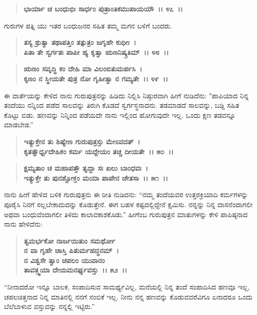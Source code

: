 \begin{verse}
\textbf{ಭಾರ್ಯಾ ಚ ಬಂಧುಭಿಃ ಸಾರ್ಧಂ ಪುತ್ರಾಂತಿಕಮುಪಾಯಯೌ~।। ೪೭~।।}
\end{verse}

ಗುರುಗಳ ಪತ್ನಿ ಯು ಇತರ ಬಂಧುಜನರ ಸಹಿತ ತಮ್ಮ ಮಗನ ಬಳಿಗೆ ಬಂದರು.

\begin{verse}
\textbf{ತಸ್ಯ ಶ್ರುತ್ವಾ ತಥಾಪತ್ತಿಂ ತತ್ಪುತ್ರಂ ಜಗೃಹೇ ಕುಧೀಃ~।}\\\textbf{ಪಿತಾ ತೇ ಸ್ವರ್ಗತಃ ಪಾಪೀ ಹ್ಯ ಕೃತ್ವಾ ಋಣನಿಷ್ಕ್ರತಿಮ್~।। ೪೮~।। }
\end{verse}

\begin{verse}
\textbf{ಋಣಂ ಸವೃದ್ಧಿ ಕಂ ದೇಹಿ ಮಾ ವಿಲಂಬಿತುಮರ್ಹಸಿ~।}\\\textbf{ಕೃಣಂ ನ ಸ್ಥೀಯತೇ ಪುತ್ರ ನೋ ಗೃಹೀತ್ವಾ ನ ಗಮ್ಯತೇ~।। ೪೯~।।}
\end{verse}

ಈ ವಾರ್ತೆಯನ್ನು ಕೇಳಿದ ನಾನು ಗುರುಪುತ್ರನನ್ನು ಹಿಡಿದು ನಿಲ್ಲಿಸಿ ನಿಷ್ಠುರವಾಗಿ ಹೀಗೆ ನುಡಿದೆನು: "ಪಾಪಿಯಾದ ನಿನ್ನ ತಂದೆಯು ನನ್ನಿಂದ ಪಡೆದ ಸಾಲವನ್ನು ತಿರುಗಿ ಕೊಡದೆ ಸ್ವರ್ಗಸ್ಥನಾದನು. ತಡಮಾಡದೆ ಸಾಲವನ್ನು, ಬಡ್ಡಿ ಸಹಿತ ಕೊಟ್ಟು ಬಿಡು. ಹಣವನ್ನು ನಿನ್ನಿಂದ ಪಡೆಯದೇ ನಾನು ಇಲ್ಲಿಂದ ಹೋಗುವುದೇ ಇಲ್ಲ. ಒಂದು ಕ್ಷಣ ತಡವನ್ನೂ ಮಾಡಬೇಡ.”

\begin{verse}
\textbf{ಇತ್ಯುಕ್ತೇನ ತು ಶಿಷ್ಯೇಣ ಗುರುಪುತ್ರಸ್ತು ಮೇಽವದತ್~।}\\\textbf{ ಕೃತತ್ವೌರ್ಧ್ವದೇಹಿಕಂ ಕರ್ಮ ಯದ್ದೇಯಂ ತಚ್ಚ ದೀಯತೇ~।। ೫೦~।। }
\end{verse}

\begin{verse}
\textbf{ಕ್ಷಮ್ಯತಾಂ ಚ ಮಹಾಪತ್ತೌ ತ್ವದ್ದಾ ಸಃ ಖಲು ಬಾಂಧವಃ~।}\\\textbf{ಇತ್ಯುಕ್ತೇ ತು ಪುನಶ್ಚೋಕ್ತಂ ಮಯಾ ಪಾಪೇನ ಚೇತಸಾ~।। ೫೧~।।}
\end{verse}

ನಾನು ಹೀಗೆ ಹೇಳಿದ ಬಳಿಕ ಗುರುಪುತ್ರನು ಈ ರೀತಿ ನುಡಿದನು: “ನಮ್ಮ ತಂದೆಯವರ ಉತ್ತರಕ್ರಿಯಾದಿ ಕರ್ಮಗಳನ್ನು ಪೂರೈಸಿ ನಿನಗೆ ಸಲ್ಲಬೇಕಾದುದನ್ನು ಕೊಡುತ್ತೇನೆ. ಈಗ ಬಹಳ ಕಷ್ಟದಲ್ಲಿದ್ದೇನೆ ಕ್ಷಮಿಸು. ನನ್ನನ್ನು ನಿನ್ನ ದಾಸನೆಂದಾಗಲೀ ಅಥವಾ ಬಂಧುವೆಂದಾಗಲೀ ತಿಳಿದು ಕಾಲಾವಕಾಶಕೊಡು.” ಹೀಗೆಂಬ ಗುರುಪುತ್ರನ ಮಾತುಗಳನ್ನು ಕೇಳಿ ಪಾಪಿಷ್ಠನಾದ ನಾನು ಹೇಳಿದೆನು:

\begin{verse}
\textbf{ತ್ವಮರ್ಭಕೋ ನಾರ್ಜಯಿತುಂ ಸಮರ್ಥೋ}\\\textbf{ನ ವಾ ಗೃಹೇ ಚಾಸ್ತಿ ಪಿತುರ್ಮಹದ್ಧನಮ್~।}\\\textbf{ನ ವಿಶ್ವಸೇ ತ್ವಾಂ ಚಪಲಂ ಯುವಾನಂ} \\\textbf{ತಾವತ್ತ್ವಯಾ ದೇಯಮನರ್ಘ್ಯವಸ್ತು~।। ೫೨~।।}
\end{verse}

“ನೀನಾದರೋ ಇನ್ನೂ ಬಾಲಕ, ಸಂಪಾದಿಸುವ ಸಾಮರ್ಥ್ಯವಿಲ್ಲ, ಮನೆಯಲ್ಲಿ ನಿನ್ನ ತಂದೆ ಸಂಪಾದಿಸಿದ ಹಣವೂ ಇಲ್ಲ, ಚಪಲಚಿತ್ತನಾದ ನಿನ್ನ ಮಾತಿನಲ್ಲಿ ನನಗೆ ನಂಬಿಕೆ ಇಲ್ಲ. ನೀನು ನನ್ನ ಹಣವನ್ನು ಕೊಡುವವರೆವಿಗೂ ಏನಾದರೂ ಒಂದು ಬೆಲೆಬಾಳುವ ವಸ್ತುವನ್ನು ನನ್ನಲ್ಲಿ ಇಟ್ಟಿರು.”

